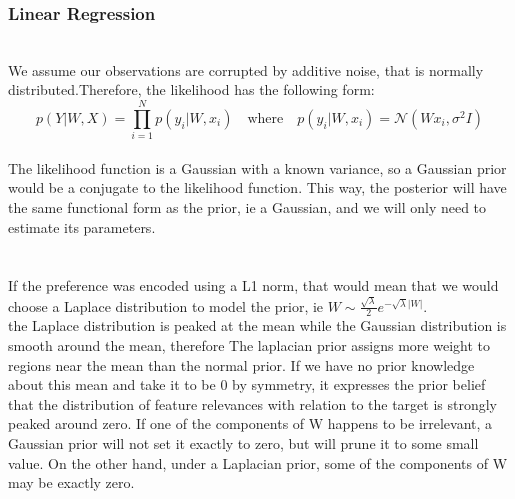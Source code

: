 \documentclass[a4paper,11pt]{article}
\theoremstyle{mytheor}
\begin{document}
\subsubsection{Linear Regression}
\smallskip
\\We assume our observations are corrupted by additive noise, that is normally distributed.Therefore, the likelihood has the following form:
\begin{equation*}
p \left({Y|W, X} \right) = \prod\limits_{i=1}^{N} p \left(y_{i}|W,x_{i}\right) \quad \text{where} \quad p \left(y_{i}|W,x_{i}\right) = \mathcal{N}(W x_i, \sigma^2I) 
\end{equation*}
\smallskip
{}
\smallskip
\\The likelihood function is a Gaussian with a known variance, so a Gaussian prior would be a conjugate to the likelihood function. This way, the posterior will have the same functional form as the prior, ie a Gaussian, and we will only need to estimate its parameters.
\smallskip
\\\\
\smallskip
\\If the preference was encoded using a L1 norm, that would mean that we would choose a Laplace distribution to model the prior, ie $ W \sim \frac{\sqrt\lambda}{2} e^{-\sqrt\lambda|W|}$.\\
the Laplace distribution is peaked at the mean while the Gaussian distribution is smooth around the mean, therefore The laplacian prior assigns more weight to regions near
the mean than the normal prior. If we have no prior knowledge about this mean and take it to be 0 by symmetry, it expresses the prior belief that the distribution of feature relevances with relation to the target is strongly peaked around zero.
If one of the components of W  happens to be irrelevant, a Gaussian prior will not set it exactly to zero, but will prune it to some small value. On the other hand, under a Laplacian prior, some of the components of W may be exactly zero.
\end{document}
